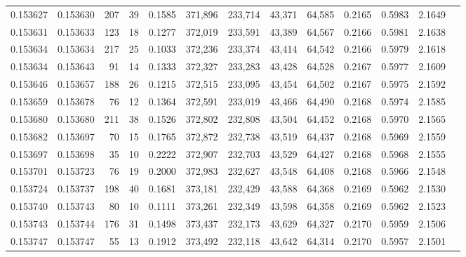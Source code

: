 \begin{tabular}{rrrrrrrrrrrrr}
0.153627 & 0.153630 &   207 &  39 &                                     0.1585 & 371,896 & 233,714 &  43,371 &  64,585 & 0.2165 & 0.5983 & 2.1649 \\
0.153631 & 0.153633 &   123 &  18 &                                     0.1277 & 372,019 & 233,591 &  43,389 &  64,567 & 0.2166 & 0.5981 & 2.1638 \\
0.153634 & 0.153634 &   217 &  25 &                                     0.1033 & 372,236 & 233,374 &  43,414 &  64,542 & 0.2166 & 0.5979 & 2.1618 \\
0.153634 & 0.153643 &    91 &  14 &                                     0.1333 & 372,327 & 233,283 &  43,428 &  64,528 & 0.2167 & 0.5977 & 2.1609 \\
0.153646 & 0.153657 &   188 &  26 &                                     0.1215 & 372,515 & 233,095 &  43,454 &  64,502 & 0.2167 & 0.5975 & 2.1592 \\
0.153659 & 0.153678 &    76 &  12 &                                     0.1364 & 372,591 & 233,019 &  43,466 &  64,490 & 0.2168 & 0.5974 & 2.1585 \\
0.153680 & 0.153680 &   211 &  38 &                                     0.1526 & 372,802 & 232,808 &  43,504 &  64,452 & 0.2168 & 0.5970 & 2.1565 \\
0.153682 & 0.153697 &    70 &  15 &                                     0.1765 & 372,872 & 232,738 &  43,519 &  64,437 & 0.2168 & 0.5969 & 2.1559 \\
0.153697 & 0.153698 &    35 &  10 &                                     0.2222 & 372,907 & 232,703 &  43,529 &  64,427 & 0.2168 & 0.5968 & 2.1555 \\
0.153701 & 0.153723 &    76 &  19 &                                     0.2000 & 372,983 & 232,627 &  43,548 &  64,408 & 0.2168 & 0.5966 & 2.1548 \\
0.153724 & 0.153737 &   198 &  40 &                                     0.1681 & 373,181 & 232,429 &  43,588 &  64,368 & 0.2169 & 0.5962 & 2.1530 \\
0.153740 & 0.153743 &    80 &  10 &                                     0.1111 & 373,261 & 232,349 &  43,598 &  64,358 & 0.2169 & 0.5962 & 2.1523 \\
0.153743 & 0.153744 &   176 &  31 &                                     0.1498 & 373,437 & 232,173 &  43,629 &  64,327 & 0.2170 & 0.5959 & 2.1506 \\
0.153747 & 0.153747 &    55 &  13 &                                     0.1912 & 373,492 & 232,118 &  43,642 &  64,314 & 0.2170 & 0.5957 & 2.1501 \\

\end{tabular}

